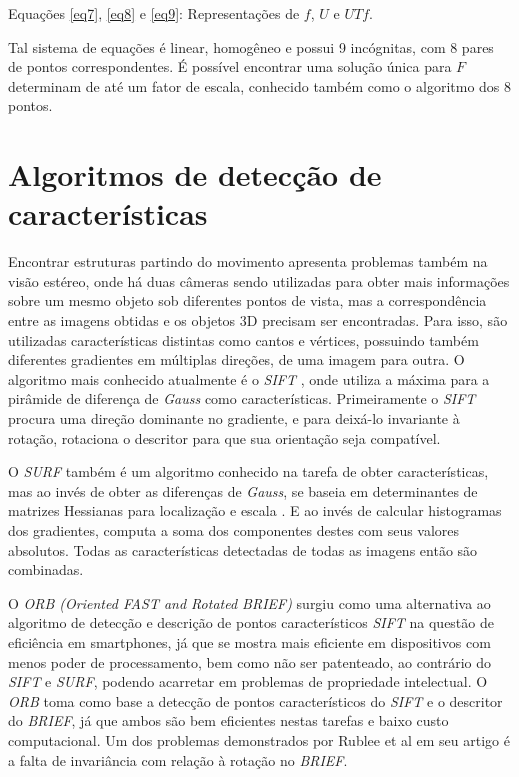 Equações \eqref{eq7}, \eqref{eq8} e \eqref{eq9}: Representações de $f$, $U$ e $UTf$.

Tal sistema de equações é linear, homogêneo e possui 9 incógnitas, com 8 pares de pontos correspondentes. É possível encontrar uma solução única para $F$ determinam de até um fator de escala, conhecido também como o algoritmo dos 8 pontos.


\section{Algoritmos de detecção de características}

Encontrar estruturas partindo do movimento apresenta problemas também na visão estéreo, onde há duas câmeras sendo utilizadas para obter mais informações sobre um mesmo objeto sob diferentes pontos de vista, mas a correspondência entre as imagens obtidas e os objetos 3D precisam ser encontradas. Para isso, são utilizadas características distintas como cantos e vértices, possuindo também diferentes gradientes em múltiplas direções, de uma imagem para outra. O algoritmo mais conhecido atualmente é o \textit{SIFT} \cite{SIFT}, onde utiliza a máxima para a pirâmide de diferença de \textit{Gauss} como características. Primeiramente o \textit{SIFT} procura uma direção dominante no gradiente, e para deixá-lo invariante à rotação, rotaciona o descritor para que sua orientação seja compatível.

O \textit{SURF}\cite{SURF} também é um algoritmo conhecido na tarefa de obter características, mas ao invés de obter as diferenças de \textit{Gauss}, se baseia em determinantes de matrizes Hessianas para localização e escala \cite{Hessian}. E ao invés de calcular histogramas dos gradientes, computa a soma dos componentes destes com seus valores absolutos. Todas as características detectadas de todas as imagens então são combinadas.

O \textit{ORB (Oriented FAST and Rotated BRIEF)} surgiu como uma alternativa ao algoritmo de detecção e descrição de pontos característicos \textit{SIFT} na questão de eficiência em smartphones, já que se mostra mais eficiente em dispositivos com menos poder de processamento, bem como não ser patenteado, ao contrário do \textit{SIFT} e \textit{SURF}, podendo acarretar em problemas de propriedade intelectual. O \textit{ORB} toma como base a detecção de pontos característicos do \textit{SIFT} e o descritor do \textit{BRIEF}, já que ambos são bem eficientes nestas tarefas e baixo custo computacional. Um dos problemas demonstrados por Rublee et al\cite{ORB-Artigo} em seu artigo é a falta de invariância com relação à rotação no \textit{BRIEF}.

